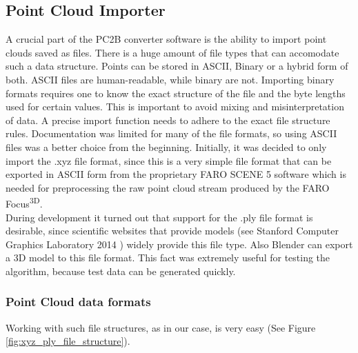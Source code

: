 \subsection{Point Cloud Importer}

A crucial part of the PC2B converter software is the ability to import point clouds saved as files. There is a huge amount of file types that can accomodate such a data structure. Points can be stored in ASCII, Binary or a hybrid form of both. ASCII files are human-readable, while binary are not. Importing binary formats requires one to know the exact structure of the file and the byte lengths used for certain values. This is important to avoid mixing and misinterpretation of data. A precise import function needs to adhere to the exact file structure rules. Documentation was limited for many of the file formats, so using ASCII files was a better choice from the beginning. Initially, it was decided to only import the .xyz file format, since this is a very simple file format that can be exported in ASCII form from the proprietary FARO SCENE 5 software which is needed for preprocessing the raw point cloud stream produced by the FARO Focus\textsuperscript{3D}.\\
During development it turned out that support for the .ply file format is desirable, since scientific websites that provide models (see Stanford Computer Graphics Laboratory 2014 \parencite{Stanford_repo}) widely provide this file type. Also Blender can export a 3D model to this file format. This fact was extremely useful for testing the algorithm, because test data can be generated quickly.

\subsubsection{Point Cloud data formats}

Working with such file structures, as in our case, is very easy (See Figure \ref{fig:xyz_ply_file_structure}).


